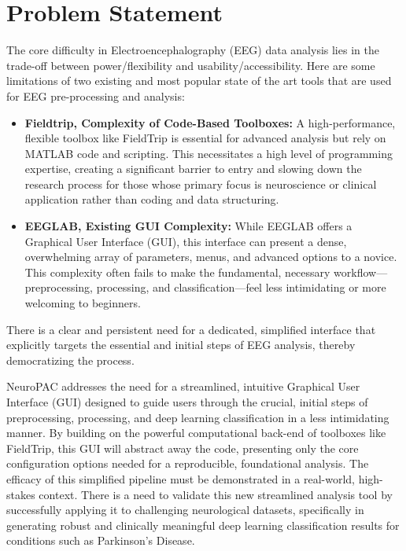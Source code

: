 \documentclass[12pt]{report}
\begin{document}
\section{Problem Statement}
The core difficulty in Electroencephalography (EEG) data analysis lies in the trade-off between power/flexibility and usability/accessibility. Here are some limitations of two existing and most popular state of the art tools that are used for EEG pre-processing and analysis:

\begin{itemize}
\item \textbf{Fieldtrip, Complexity of Code-Based Toolboxes:}   A high-performance, flexible toolbox like FieldTrip is essential for advanced analysis but rely on MATLAB code and scripting. This necessitates a high level of programming expertise, creating a significant barrier to entry and slowing down the research process for those whose primary focus is neuroscience or clinical application rather than coding and data structuring.

\item \textbf{EEGLAB, Existing GUI Complexity:} While EEGLAB offers a Graphical User Interface (GUI), this interface can present a dense, overwhelming array of parameters, menus, and advanced options to a novice. This complexity often fails to make the fundamental, necessary workflow—preprocessing, processing, and classification—feel less intimidating or more welcoming to beginners.
\end{itemize}

There is a clear and persistent need for a dedicated, simplified interface that explicitly targets the essential and initial steps of EEG analysis, thereby democratizing the process.

NeuroPAC addresses the need for a streamlined, intuitive Graphical User Interface (GUI) designed to guide users through the crucial, initial steps of preprocessing, processing, and deep learning classification in a less intimidating manner. By building on the powerful computational back-end of toolboxes like FieldTrip, this GUI will abstract away the code, presenting only the core configuration options needed for a reproducible, foundational analysis.
The efficacy of this simplified pipeline must be demonstrated in a real-world, high-stakes context. There is a need to validate this new streamlined analysis tool by successfully applying it to challenging neurological datasets, specifically in generating robust and clinically meaningful deep learning classification results for conditions such as Parkinson's Disease.
\end{document}
